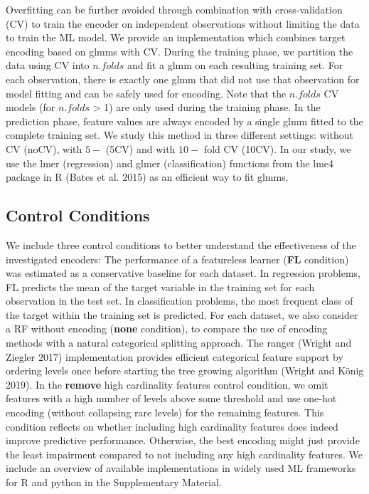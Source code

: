 \documentclass[smallextended]{svjour3}       %
\begin{document}
Overfitting can be further avoided through combination with cross-validation (CV) to train the encoder on independent observations without limiting the data to train the ML model.
We provide an implementation which combines target encoding based on glmms with CV.
During the training phase, we partition the data using CV into \(n.folds\) and fit a glmm on each resulting training set.
For each observation, there is exactly one glmm that did not use that observation for model fitting and can be safely used for encoding.
Note that the \(n.folds\) CV models (for \(n.folds\) \textgreater{} 1) are only used during the training phase.
In the prediction phase, feature values are always encoded by a single glmm fitted to the complete training set.
We study this method in three different settings: without CV (noCV), with \(5-\) (5CV) and with \(10-\) fold CV (10CV).
In our study, we use the lmer (regression) and glmer (classification) functions from the lme4 package in R (Bates et al. 2015) as an efficient way to fit glmms.

\hypertarget{control-conditions}{%
\subsection{Control Conditions}\label{control-conditions}}

We include three control conditions to better understand the effectiveness of the investigated encoders:
The performance of a featureless learner (\textbf{FL} condition) was estimated as a conservative baseline for each dataset.
In regression problems, FL predicts the mean of the target variable in the training set for each observation in the test set.
In classification problems, the most frequent class of the target within the training set is predicted.
For each dataset, we also consider a RF without encoding (\textbf{none} condition), to compare the use of encoding methods with a natural categorical splitting approach.
The ranger (Wright and Ziegler 2017) implementation provides efficient categorical feature support by ordering levels once before starting the tree growing algorithm (Wright and König 2019).
In the \textbf{remove} high cardinality features control condition, we omit features with a high number of levels above some threshold and use one-hot encoding (without collapsing rare levels) for the remaining features.
This condition reflects on whether including high cardinality features does indeed improve predictive performance.
Otherwise, the best encoding might just provide the least impairment compared to not including any high cardinality features.
We include an overview of available implementations in widely used ML frameworks for R and python in the Supplementary Material.
\end{document}
